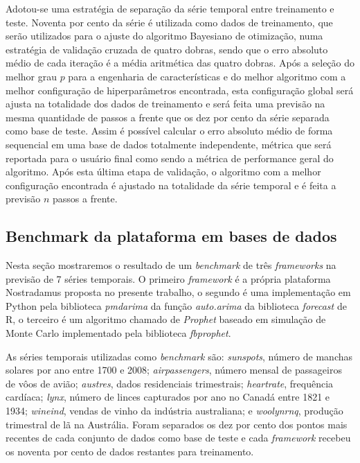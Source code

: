 \documentclass[twocolumn]{rbef}
\newcommand{\1}{\mathbbm{1}}
\begin{document}
Adotou-se uma estratégia de separação da série temporal entre treinamento e teste. Noventa por cento da série é utilizada como dados de treinamento, que serão utilizados para o ajuste do algoritmo Bayesiano de otimização, numa estratégia de validação cruzada de quatro dobras, sendo que o erro absoluto médio de cada iteração é a média aritmética das quatro dobras. Após a seleção do melhor grau $p$ para a engenharia de características e do melhor algoritmo com a melhor configuração de hiperparâmetros encontrada, esta configuração global será ajusta na totalidade dos dados de treinamento e será feita uma previsão na mesma quantidade de passos a frente que os dez por cento da série separada como base de teste. Assim é possível calcular o erro absoluto médio de forma sequencial em uma base de dados totalmente independente, métrica que será reportada para o usuário final como sendo a métrica de performance geral do algoritmo. Após esta última etapa de validação, o algoritmo com a melhor configuração encontrada é ajustado na totalidade da série temporal e é feita a previsão $n$ passos a frente.

\subsection{Benchmark da plataforma em bases de dados} \label{benchmark}

Nesta seção mostraremos o resultado de um \textit{benchmark} de três \textit{frameworks} na previsão de 7 séries temporais. O primeiro \textit{framework} é a própria plataforma Nostradamus proposta no presente trabalho, o segundo é uma implementação em Python pela biblioteca \textit{pmdarima} da função \textit{auto.arima} da biblioteca \textit{forecast} de R, o terceiro é um algoritmo chamado de \textit{Prophet} baseado em simulação de Monte Carlo implementado pela biblioteca \textit{fbprophet}.

As séries temporais utilizadas como \textit{benchmark} são: \textit{sunspots}, número de manchas solares por ano entre 1700 e 2008; \textit{airpassengers}, número mensal de passageiros de vôos de avião; \textit{austres}, dados residenciais trimestrais; \textit{heartrate}, frequência cardíaca; \textit{lynx}, número de linces capturados por ano no Canadá entre 1821 e 1934; \textit{wineind}, vendas de vinho da indústria australiana; e \textit{woolynrnq}, produção trimestral de lã na Austrália. Foram separados os dez por cento dos pontos mais recentes de cada conjunto de dados como base de teste e cada \textit{framework} recebeu os noventa por cento de dados restantes para treinamento.
\end{document}
